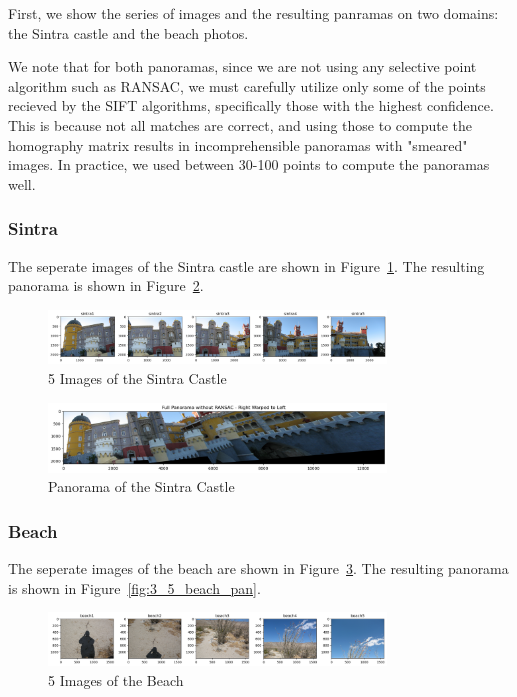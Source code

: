 \documentclass{article}
\begin{document}
First, we show the series of images and the resulting panramas on two domains: the Sintra castle and the beach photos.

We note that for both panoramas, since we are not using any selective point algorithm such as RANSAC, we must carefully utilize only some of the points recieved by the SIFT algorithms, specifically those with the highest confidence. This is because not all matches are correct, and using those to compute the homography matrix results in incomprehensible panoramas with "smeared" images. In practice, we used between 30-100 points to compute the panoramas well.

\subsubsection*{Sintra}

The seperate images of the Sintra castle are shown in Figure~\ref{fig:3_5_sintras}. The resulting panorama is shown in Figure~\ref{fig:3_5_sin_pan}.

\begin{figure}[h!]
    \centering
    \includegraphics[width=0.8\textwidth]{../output/3.5_sintras.png}
    \caption{5 Images of the Sintra Castle}
    \label{fig:3_5_sintras}
\end{figure}

\begin{figure}[h!]
    \centering
    \includegraphics[width=0.8\textwidth]{../output/3.5_sin_pan.png}
    \caption{Panorama of the Sintra Castle}
    \label{fig:3_5_sin_pan}
\end{figure}

\subsubsection*{Beach}

The seperate images of the beach are shown in Figure~\ref{fig:3_5_beaches}. The resulting panorama is shown in Figure~\ref{fig:3_5_beach_pan}.

\begin{figure}[h!]
    \centering
    \includegraphics[width=0.8\textwidth]{../output/3.5_beaches.png}
    \caption{5 Images of the Beach}
    \label{fig:3_5_beaches}
\end{figure}
\end{document}
